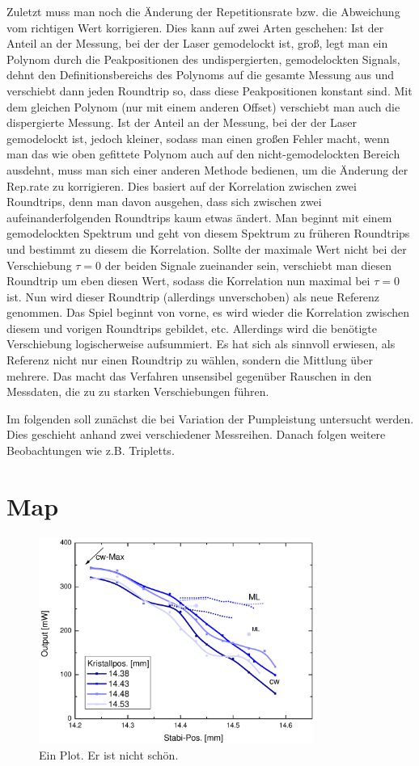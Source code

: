 \documentclass[bachelor,       %
               twoside,        %
               BCOR10mm,       %
               english,ngerman, %
               ]{GAUBM}
\begin{document}
Zuletzt muss man noch die Änderung der Repetitionsrate bzw. die Abweichung vom richtigen Wert korrigieren.
Dies kann auf zwei Arten geschehen:
Ist der Anteil an der Messung, bei der der Laser gemodelockt ist, groß, legt man ein Polynom durch die Peakpositionen des undispergierten, gemodelockten Signals, dehnt den Definitionsbereichs des Polynoms auf die gesamte Messung aus und verschiebt dann jeden Roundtrip so, dass diese Peakpositionen konstant sind.
Mit dem gleichen Polynom (nur mit einem anderen Offset) verschiebt man auch die dispergierte Messung.
Ist der Anteil an der Messung, bei der der Laser gemodelockt ist, jedoch kleiner, sodass man einen großen Fehler macht, wenn man das wie oben gefittete Polynom auch auf den nicht-gemodelockten Bereich ausdehnt, muss man sich einer anderen Methode bedienen, um die Änderung der Rep.rate zu korrigieren.
Dies basiert auf der Korrelation zwischen zwei Roundtrips, denn man davon ausgehen, dass sich zwischen zwei aufeinanderfolgenden Roundtrips kaum etwas ändert.
Man beginnt mit einem gemodelockten Spektrum und geht von diesem Spektrum zu früheren Roundtrips und bestimmt zu diesem die Korrelation.
Sollte der maximale Wert nicht bei der Verschiebung $\tau=0$ der beiden Signale zueinander sein, verschiebt man diesen Roundtrip um eben diesen Wert, sodass die Korrelation nun maximal bei $\tau=0$ ist.
Nun wird dieser Roundtrip (allerdings unverschoben) als neue Referenz genommen.
Das Spiel beginnt von vorne, es wird wieder die Korrelation zwischen diesem und vorigen Roundtrips gebildet, etc.
Allerdings wird die benötigte Verschiebung logischerweise aufsummiert.
Es hat sich als sinnvoll erwiesen, als Referenz nicht nur einen Roundtrip zu wählen, sondern die Mittlung über mehrere.
Das macht das Verfahren unsensibel gegenüber Rauschen in den Messdaten, die zu zu starken Verschiebungen führen.

Im folgenden soll zunächst die bei Variation der Pumpleistung untersucht werden.
Dies geschieht anhand zwei verschiedener Messreihen.
Danach folgen weitere Beobachtungen wie z.B. Tripletts.

\section{Map}
\begin{figure}[!htb]
	\centering
	\includegraphics[width=0.8\textwidth]{figures/map.pdf}
	\caption{Ein Plot. Er ist nicht schön.}
	\label{fig:map}
\end{figure}
\end{document}
